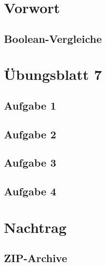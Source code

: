 \documentclass[aspectratio=169,usepdftitle=true,11pt,ngerman,t]{beamer}
\subtitle{Tutorium 8}
\date{06. Dezember 2024}
\begin{document}
\section[Ich muss noch ein wenig schimpfen...]{Vorwort}

\subsection{Boolean-Vergleiche}



\section[Java ist auch eine Insel!]{Übungsblatt 7}

\subsection{Aufgabe 1}


\subsection{Aufgabe 2}


\subsection{Aufgabe 3}


\subsection{Aufgabe 4}


\section[Von Päckchen und Paketen...]{Nachtrag}

\subsection{ZIP-Archive}

\end{document}
